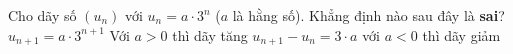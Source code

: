 \begin{ex}%
	Cho dãy số $(u_n)$ với $u_n=a\cdot 3^n$ ($a$ là hằng số). Khẳng định nào sau đây là \textbf{sai}?
	\choice
	{$ u_{n+1}=a\cdot 3^{n+1} $}
	{Với $a>0$ thì dãy tăng}
	{\True $ u_{n+1}-u_n=3\cdot a $}
	{với $a<0$ thì dãy giảm}
\end{ex}